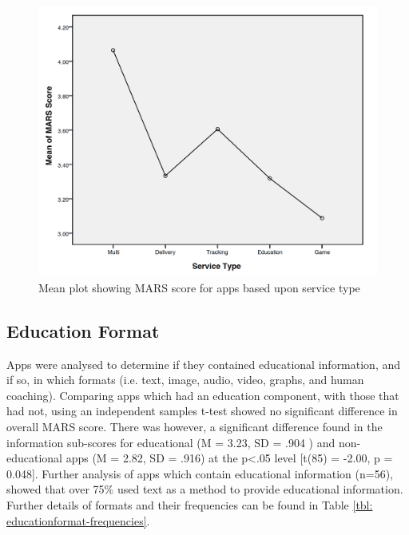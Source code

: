\begin{figure}[h]
    \centering
    \includegraphics[scale=0.40, angle=0]{Files/prevention-study-1/figures/servicetype-mars-anova}
    \caption{Mean plot showing MARS score for apps based upon service type}
    \label{fig: servicetype-mars-anova}
\end{figure}

\subsection{Education Format}
Apps were analysed to determine if they contained educational information, and if so, in which formats (i.e. text, image, audio, video, graphs, and human coaching).
Comparing apps which had an education component, with those that had not, using an independent samples t-test showed no significant difference in overall MARS score. There was however, a significant difference found in the information sub-scores for educational (M = 3.23, SD = .904 ) and non-educational apps (M = 2.82, SD = .916) at the p\textless.05 level [t(85) = -2.00, p = 0.048].
Further analysis of apps which contain educational information (n=56), showed that over 75\% used text as a method to provide educational information. Further details of formats and their frequencies can be found in Table \ref{tbl: educationformat-frequencies}.

